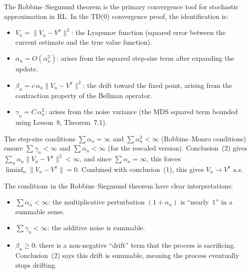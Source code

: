 \documentclass[11pt,a4paper]{article}
\begin{document}
\begin{rlconnection}[title={Robbins--Siegmund in TD Convergence}]
The Robbins--Siegmund theorem is the primary convergence tool for
stochastic approximation in RL.  In the TD(0) convergence proof,
the identification is:
\begin{itemize}[nosep]
  \item $V_n = \|V_n - V^\pi\|^2$: the Lyapunov function
    (squared error between the current estimate and the true
    value function).
  \item $\alpha_n = O(\alpha_n^2)$: arises from the squared
    step-size term after expanding the update.
  \item $\beta_n = c\, \alpha_n \|V_n - V^\pi\|^2$: the drift
    toward the fixed point, arising from the contraction property
    of the Bellman operator.
  \item $\gamma_n = C\, \alpha_n^2$: arises from the noise
    variance (the MDS squared term bounded using Lesson~8,
    Theorem~7.1).
\end{itemize}
The step-size conditions $\sum \alpha_n = \infty$ and
$\sum \alpha_n^2 < \infty$ (Robbins--Monro conditions) ensure
$\sum \gamma_n < \infty$ and $\sum \alpha_n < \infty$ (for the
rescaled version).  Conclusion~(2) gives
$\sum_n \alpha_n \|V_n - V^\pi\|^2 < \infty$, and since
$\sum \alpha_n = \infty$, this forces
$\liminf_n \|V_n - V^\pi\| = 0$.  Combined with conclusion~(1),
this gives $V_n \to V^\pi$ a.s.
\end{rlconnection}

\begin{remark}
\label{rem:rs_conditions}
The conditions in the Robbins--Siegmund theorem have clear
interpretations:
\begin{itemize}[nosep]
  \item $\sum \alpha_n < \infty$: the multiplicative perturbation
    $(1 + \alpha_n)$ is ``nearly~$1$'' in a summable sense.
  \item $\sum \gamma_n < \infty$: the additive noise is summable.
  \item $\beta_n \geq 0$: there is a non-negative ``drift'' term
    that the process is sacrificing.  Conclusion~(2) says this
    drift is summable, meaning the process eventually stops
    drifting.
\end{itemize}
\end{remark}

\end{document}
